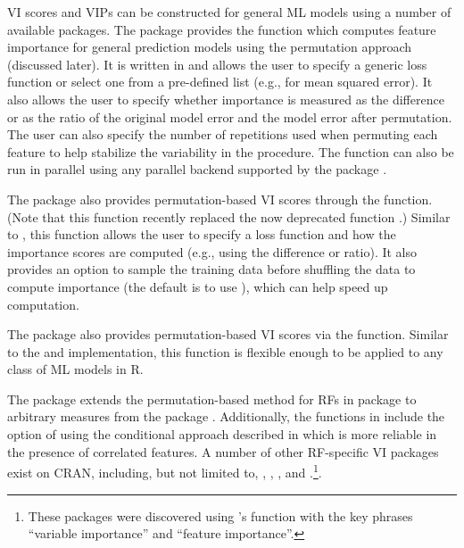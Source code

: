 VI scores and VIPs can be constructed for general ML models using a
number of available packages. The  package \citep{R-iml}
provides the  function which computes feature
importance for general prediction models using the permutation approach
(discussed later). It is written in  \citep{R-R6} and allows
the user to specify a generic loss function or select one from a
pre-defined list (e.g.,  for mean squared error). It
also allows the user to specify whether importance is measured as the
difference or as the ratio of the original model error and the model
error after permutation. The user can also specify the number of
repetitions used when permuting each feature to help stabilize the
variability in the procedure. The  function can
also be run in parallel using any parallel backend supported by the
 package \citep{R-foreach}.

The  package \citep{R-ingredients} also provides
permutation-based VI scores through the 
function. (Note that this function recently replaced the now deprecated
 function  \citep{R-DALEX}.)
Similar to , this function allows the user to
specify a loss function and how the importance scores are computed
(e.g., using the difference or ratio). It also provides an option to
sample the training data before shuffling the data to compute importance
(the default is to use ), which can help speed up
computation.

The  package \citep{R-mmpf} also provides
permutation-based VI scores via the
\newline {} function. Similar to the
 and  implementation, this function is
flexible enough to be applied to any class of ML models in R.

The  package \citep{R-varImp} extends the
permutation-based method for RFs in package 
\citep{R-party} to arbitrary measures from the 
package \citep{R-measures}. Additionally, the functions in 
include the option of using the conditional approach described in
\citet{strobl-2019-conditional} which is more reliable in the presence
of correlated features. A number of other RF-specific VI packages exist
on CRAN, including, but not limited to,  \citep{R-vita},
 \citep{R-rfVarImpOOB},
 \citep{R-randomForestExplainer}, and
 \citep{R-tree.interpreter}.\footnote{These
  packages were discovered using 's 
  function \citep{R-pkgsearch} with the key phrases ``variable
  importance'' and ``feature importance''.}.

